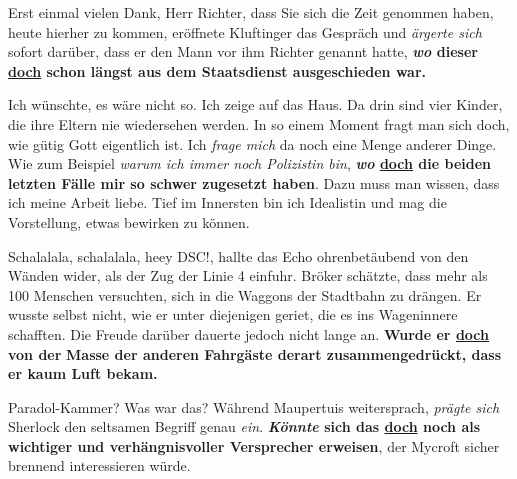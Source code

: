 {\begin{exe}
	\ex\label{1063} 
	\scriptsize
	\glqq Erst einmal vielen Dank, Herr Richter, dass Sie sich die Zeit genommen haben, heute hierher zu kommen\grqq{}, eröffnete Kluftinger das Gespräch 		und \emph{ärgerte sich} sofort darüber, dass er den Mann vor ihm \glqq Richter\grqq{} genannt hatte, \textbf{\textit{wo} dieser \underline{doch} schon 		längst aus dem Staatsdienst ausgeschieden war.}	
	\hfill\hbox {\citet[269]{Kluepfel2012}}
\end{exe}

\begin{exe}
	\ex\label{1064} 
	\scriptsize
	\glqq Ich wünschte, es wäre nicht so.\grqq{} Ich zeige auf das Haus. \glqq Da drin sind vier Kinder, die ihre Eltern nie wiedersehen werden.\grqq{}
	\glqq In so einem Moment fragt man sich doch, wie gütig Gott eigentlich ist.\grqq{}
	\glqq Ich \emph{frage mich} da noch eine Menge anderer Dinge.\grqq{} Wie zum Beispiel \emph{warum ich immer noch Polizistin bin}, \textbf{\textit{wo} 		\underline{doch} die beiden letzten Fälle mir so schwer zugesetzt haben}. Dazu muss man wissen, dass ich meine Arbeit liebe. Tief im Innersten bin ich 		Idealistin und mag die Vorstellung, etwas bewirken zu können.	
	\hfill\hbox {\citet[40]{Castillo2012}}
\end{exe}

\begin{exe}
	\ex\label{1065} 
	\scriptsize
	\glqq Schalalala, schalalala, heey DSC!\grqq{}, hallte das Echo ohrenbetäubend von den Wänden wider, als der Zug der Linie 4 einfuhr. Bröker schätzte, 		dass mehr als 100 Menschen versuchten, sich in die Waggons der Stadtbahn zu drängen. Er wusste selbst nicht, wie er unter diejenigen geriet, die es ins 	Wageninnere schafften. Die Freude darüber dauerte jedoch nicht lange an. \textbf{Wurde er \underline{doch} von der} \textbf{Masse der anderen Fahrgäste 	derart zusammengedrückt, dass er kaum Luft bekam.}	
	\newline              		
	\hbox{}\hfill\hbox {\citet[7]{Glauche2014}}
\end{exe}

\begin{exe}
	\ex\label{1066} 
	\scriptsize
	Paradol-Kammer? Was war das? Während Maupertuis weitersprach, \emph{prägte sich} Sherlock den seltsamen Begriff genau \emph{ein}. 							\textbf{\textit{Könnte} sich das \underline{doch} noch als wichtiger und verhängnisvoller Versprecher erweisen}, der Mycroft sicher brennend 				interessieren würde. 	
	\hfill\hbox {\citet[337]{Lane2014}}
\end{exe}

}
